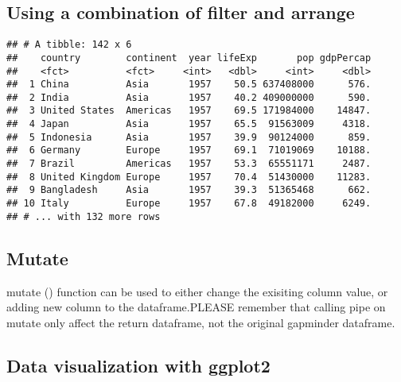 \documentclass[]{article}
\newenvironment{Shaded}{\begin{snugshade}}{\end{snugshade}}
\newcommand{\KeywordTok}[1]{\textcolor[rgb]{0.13,0.29,0.53}{\textbf{#1}}}
\newcommand{\DecValTok}[1]{\textcolor[rgb]{0.00,0.00,0.81}{#1}}
\newcommand{\StringTok}[1]{\textcolor[rgb]{0.31,0.60,0.02}{#1}}
\newcommand{\CommentTok}[1]{\textcolor[rgb]{0.56,0.35,0.01}{\textit{#1}}}
\newcommand{\OperatorTok}[1]{\textcolor[rgb]{0.81,0.36,0.00}{\textbf{#1}}}
\newcommand{\NormalTok}[1]{#1}
\begin{document}
\subsection{Using a combination of filter and
arrange}\label{using-a-combination-of-filter-and-arrange}

\begin{Shaded}
\end{Shaded}

\begin{verbatim}
## # A tibble: 142 x 6
##    country        continent  year lifeExp       pop gdpPercap
##    <fct>          <fct>     <int>   <dbl>     <int>     <dbl>
##  1 China          Asia       1957    50.5 637408000      576.
##  2 India          Asia       1957    40.2 409000000      590.
##  3 United States  Americas   1957    69.5 171984000    14847.
##  4 Japan          Asia       1957    65.5  91563009     4318.
##  5 Indonesia      Asia       1957    39.9  90124000      859.
##  6 Germany        Europe     1957    69.1  71019069    10188.
##  7 Brazil         Americas   1957    53.3  65551171     2487.
##  8 United Kingdom Europe     1957    70.4  51430000    11283.
##  9 Bangladesh     Asia       1957    39.3  51365468      662.
## 10 Italy          Europe     1957    67.8  49182000     6249.
## # ... with 132 more rows
\end{verbatim}

\subsection{Mutate}\label{mutate}

mutate () function can be used to either change the exisiting column
value, or adding new column to the dataframe.PLEASE remember that
calling pipe on mutate only affect the return dataframe, not the
original gapminder dataframe.

\subsection{Data visualization with
ggplot2}\label{data-visualization-with-ggplot2}
\end{document}
